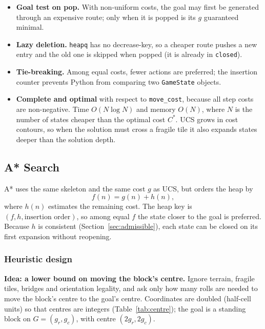 \begin{itemize}[leftmargin=*]
\item \textbf{Goal test on pop.} With non-uniform costs, the goal may first be generated through
an expensive route; only when it is popped is its $g$ guaranteed minimal.
\item \textbf{Lazy deletion.} \texttt{heapq} has no decrease-key, so a cheaper route pushes a new
entry and the old one is skipped when popped (it is already in \texttt{closed}).
\item \textbf{Tie-breaking.} Among equal costs, fewer actions are preferred; the insertion counter
prevents Python from comparing two \texttt{GameState} objects.
\item \textbf{Complete and optimal} with respect to \texttt{move\_cost}, because all step costs are
non-negative. Time $O(N \log N)$ and memory $O(N)$, where $N$ is the number of states cheaper than
the optimal cost $C^*$. UCS grows in cost contours, so when the solution must cross a fragile tile
it also expands states deeper than the solution depth.
\end{itemize}

\subsection{A* Search}

A* uses the same skeleton and the same cost $g$ as UCS, but orders the heap by
\begin{equation}
f(n) = g(n) + h(n),
\end{equation}
where $h(n)$ estimates the remaining cost. The heap key is $(f, h, \text{insertion order})$, so
among equal $f$ the state closer to the goal is preferred. Because $h$ is consistent
(Section~\ref{sec:admissible}), each state can be closed on its first expansion without reopening.

\subsubsection{Heuristic design}
\label{sec:heuristic}

\textbf{Idea: a lower bound on moving the block's centre.} Ignore terrain, fragile tiles, bridges
and orientation legality, and ask only how many rolls are needed to move the block's centre to the
goal's centre. Coordinates are doubled (half-cell units) so that centres are integers
(Table~\ref{tab:centre}); the goal is a standing block on $G=(g_r, g_c)$, with centre
$(2g_r, 2g_c)$.

